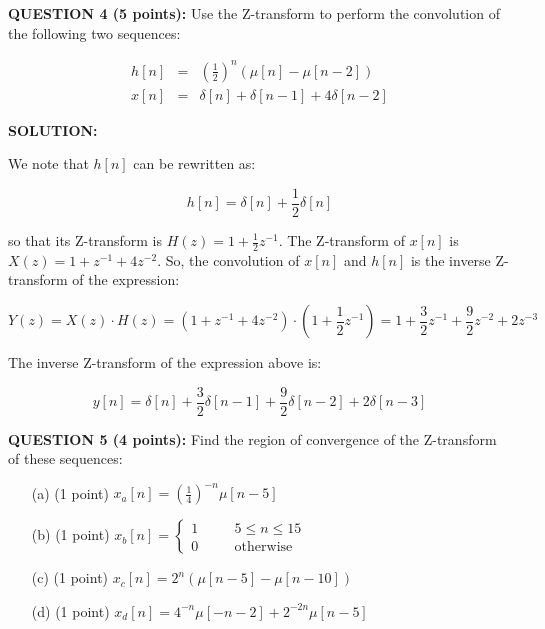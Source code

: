 \documentclass[a4paper,11pt,oneside]{article}
\begin{document}
\vspace{1cm}

\textbf{QUESTION 4 (5 points):} Use the Z-transform to perform the convolution of the following two sequences:

\[
\begin{array}{lll}
h[n]&=&\left(\frac{1}{2}\right)^n\left(\mu[n]-\mu[n-2]\right)\\
x[n]&=&\delta[n]+\delta[n-1]+4\delta[n-2]
\end{array}
\]




\vspace{1cm}

\textbf{SOLUTION:} 

We note that $h[n]$ can be rewritten as:

\[
h[n] = \delta[n]+\frac{1}{2}\delta[n]
\]

so that its Z-transform is $H(z)=1+\frac{1}{2}z^{-1}$. The Z-transform of $x[n]$ is $X(z)=1+z^{-1}+4z^{-2}$. So, the convolution of $x[n]$ and $h[n]$ is the inverse Z-transform of the expression:

\[
Y(z)=X(z)\cdot H(z)=\left(1+z^{-1}+4z^{-2}\right)\cdot\left(1+\frac{1}{2}z^{-1}\right)=1+\frac{3}{2}z^{-1}+\frac{9}{2}z^{-2}+2z^{-3}
\]

The inverse Z-transform of the expression above is:

\[
y[n]=\delta[n]+\frac{3}{2}\delta[n-1]+\frac{9}{2}\delta[n-2]+2\delta[n-3]
\]



\vspace{1cm}

\textbf{QUESTION 5 (4 points):} Find the region of convergence of the Z-transform of these sequences:

\begin{itemize}
\item[(a)] (1 point) $x_a[n]=\left(\frac{1}{4}\right)^{-n}\mu[n-5]$
\item[(b)] (1 point) $x_b[n]=\left\{\begin{array}{lll}1 &\quad& 5 \leq n \leq 15\\0 &\quad& \textrm{otherwise} \end{array}\right.$
\item[(c)] (1 point) $x_c[n]=2^n\left(\mu[n-5]-\mu[n-10]\right)$
\item[(d)] (1 point) $x_d[n]=4^{-n}\mu[-n-2]+2^{-2n}\mu[n-5]$
\end{itemize}
\end{document}
